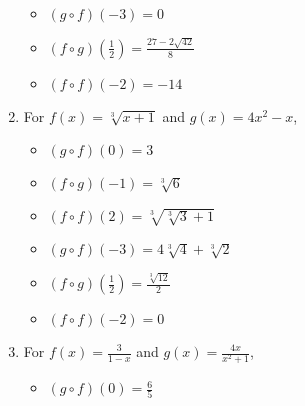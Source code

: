 \begin{enumerate}
\begin{multicols}{3}
\begin{itemize}
\item  $(g\circ f)(-3) = 0$

\item  $(f\circ g)\left(\frac{1}{2}\right) = \frac{27-2\sqrt{42}}{8}$

\item  $(f \circ f)(-2) = -14$

\end{itemize}

\end{multicols}

\item  For  $f(x) = \sqrt[3]{x+1}$ and $g(x) = 4x^2-x$,
\begin{multicols}{3}

\begin{itemize}

\item  $(g\circ f)(0) = 3$

\item  $(f\circ g)(-1) = \sqrt[3]{6}$

\item  $(f \circ f)(2) = \sqrt[3]{\sqrt[3]{3}+1}$

\end{itemize}

\end{multicols}

\begin{multicols}{3}

\begin{itemize}

\item  $(g\circ f)(-3) = 4\sqrt[3]{4}+\sqrt[3]{2}$

\item  $(f\circ g)\left(\frac{1}{2}\right) = \frac{\sqrt[3]{12}}{2}$

\item  $(f \circ f)(-2) = 0$

\end{itemize}

\end{multicols}

\item  For  $f(x) = \frac{3}{1-x}$ and $g(x) = \frac{4x}{x^2+1}$,
\begin{multicols}{3}

\begin{itemize}

\item  $(g\circ f)(0) = \frac{6}{5}$


\end{itemize}
\end{multicols}
\end{enumerate}

